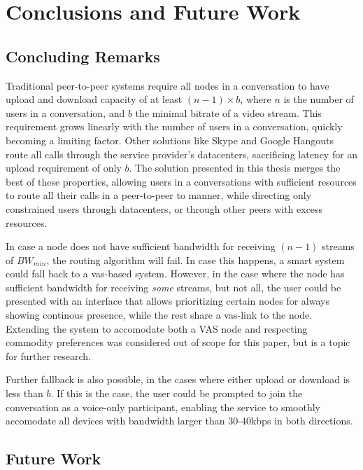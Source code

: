 \chapter{Conclusions and Future Work}\label{chp:conclusions}


\section{Concluding Remarks}\label{sec:conclusions}

Traditional peer-to-peer systems require all nodes in a conversation to have upload and download capacity of at least $(n-1) \times b$, where $n$ is the number of users in a conversation, and $b$ the minimal bitrate of a video stream. This requirement grows linearly with the number of users in a conversation, quickly becoming a limiting factor. Other solutions like Skype and Google Hangouts route all calls through the service provider's datacenters, sacrificing latency for an upload requirement of only $b$. The solution presented in this thesis merges the best of these properties, allowing users in a conversations with sufficient resources to route all their calls in a peer-to-peer to manner, while directing only constrained users through datacenters, or through other peers with excess resources.

In case a node does not have sufficient bandwidth for receiving $(n-1)$ streams of $BW_{min}$, the routing algorithm will fail. In case this happens, a smart system could fall back to a \gls{vas}-based system. However, in the case where the node has sufficient bandwidth for receiving \emph{some} streams, but not all, the user could be presented with an interface that allows prioritizing certain nodes for always showing continous presence, while the rest share a \gls{vas}-link to the node. Extending the system to accomodate both a VAS node and respecting commodity preferences was considered out of scope for this paper, but is a topic for further research.

Further fallback is also possible, in the cases where either upload or download is less than $b$. If this is the case, the user could be prompted to join the conversation as a voice-only participant, enabling the service to smoothly accomodate all devices with bandwidth larger than 30-40kbps in both directions.


\section{Future Work}\label{sec:future_work}

